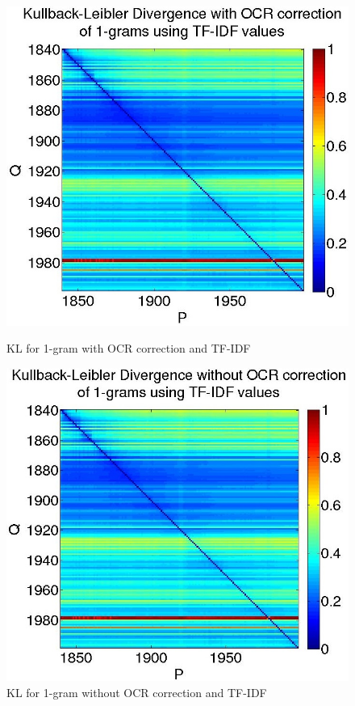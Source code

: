 \begin{figure}[H]
    \begin{minipage}[b]{0.48\linewidth}
        \includegraphics[scale=0.25]{Pictures/kullback-leibler/KL_1-grams_with_correction_tfidf.jpg}
        \caption{KL for 1-gram with OCR correction and TF-IDF}
        \label{KL-TC1}
    \end{minipage}\hfill
    \begin{minipage}[b]{0.5\linewidth}
        \includegraphics[scale=0.25]{Pictures/kullback-leibler/KL_1-grams_without_correction_tfidf.jpg}
        \caption{KL for 1-gram without OCR correction and TF-IDF}
        \label{KL-TN1}
    \end{minipage}\hfill
\end{figure}

